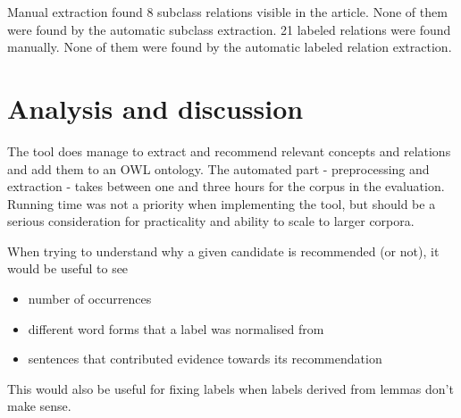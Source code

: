 \documentclass[a4paper]{report}
\begin{document}
Manual extraction found 8 subclass relations visible in the article.
None of them were found by the automatic subclass extraction.
21 labeled relations were found manually.
None of them were found by the automatic labeled relation extraction.

\section{Analysis and discussion}
\label{sec:analysis}


The tool does manage to extract and recommend relevant concepts and relations and add them to an OWL ontology.
The automated part - preprocessing and extraction - takes between one and three hours for the corpus in the evaluation.
Running time was not a priority when implementing the tool, but should be a serious consideration for practicality and ability to scale to larger corpora.

When trying to understand why a given candidate is recommended (or not), it would be useful to see

\begin{itemize}
\item number of occurrences
\item different word forms that a label was normalised from
\item sentences that contributed evidence towards its recommendation
\end{itemize}

This would also be useful for fixing labels when labels derived from lemmas don't make sense.


\end{document}

